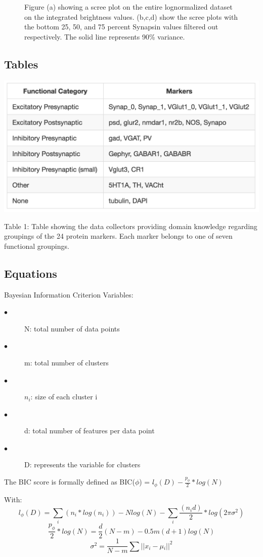 \documentclass{article}
\begin{document}
\begin{figure}
\begin{subfigure}{0.49\textwidth}
    \caption{}
  \end{subfigure}
  \caption{Figure (a) showing a scree plot on the entire lognormalized dataset on the integrated brightness values. (b,c,d) show the scree plots with the bottom 25, 50, and 75 percent Synapsin values filtered out respectively. The solid line represents 90\% variance.}
  \label{fig:figure6}
\end{figure}

\FloatBarrier
\subsection{Tables}

\begin{table}[H]
  \includegraphics[width=\linewidth]{figures/table1.png}
  \caption{Table 1: Table showing the data collectors providing domain knowledge regarding groupings of the 24 protein markers. Each marker belongs to one of seven functional groupings.}
  \label{fig:table1}
\end{table}

\FloatBarrier
\subsection{Equations}

Bayesian Information Criterion Variables:
\begin{description}
\item[$\bullet$] N: total number of data points
\item[$\bullet$] m: total number of clusters
\item[$\bullet$] $n_i$: size of each cluster i
\item[$\bullet$] d: total number of features per data point
\item[$\bullet$] D: represents the variable for clusters
\end{description}

The BIC score is formally defined as 
BIC($\phi$) = $l\widehat{}_{\phi}(D) - \frac{p_{\phi}}{2}*log(N)$

With:
\[l\widehat{}_{\phi}(D) = \sum_i (n_i * log(n_i)) - Nlog(N) - \sum_i\frac{(n_i d)}{2} * log(2\pi\sigma{}\widehat{}^2)
\]
\[
\frac{p_{\phi}}{2}*log(N) = \frac{d}{2}(N-m) - 0.5m(d+1)log(N)
\]
\[
\sigma{}\widehat{}^2 = \frac{1}{N-m} \sum{||x{}_i - \mu{}_i||}^2
\]

\newpage
\small
{
  
  
}
\end{document}
